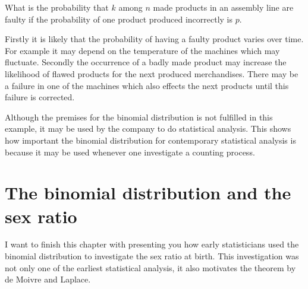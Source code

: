 \begin{example}
  What is the probability that $k$ among $n$ made products in an assembly line are faulty if the probability of one product produced incorrectly is $p$.
\end{example}

Firstly it is likely that the probability of having a faulty product varies over time. For example it may depend on the temperature of the machines which may fluctuate. Secondly the occurrence of a badly made product may increase the likelihood of flawed products for the next produced merchandises. There may be a failure in one of the machines which also effects the next products until this failure is corrected.

Although the premises for the binomial distribution is not fulfilled in this example, it may be used by the company to do statistical analysis. This shows how important the binomial distribution for contemporary statistical analysis is because it may be used whenever one investigate a counting process.

\section{The binomial distribution and the sex ratio}



I want to finish this chapter with presenting you how early statisticians used the binomial distribution to investigate the sex ratio at birth. This investigation was not only one of the earliest statistical analysis, it also motivates the theorem by de Moivre and Laplace.

